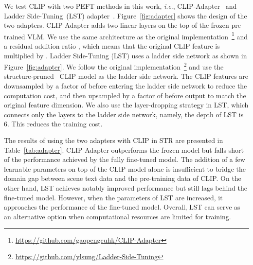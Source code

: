 \documentclass[lettersize,journal]{IEEEtran}
\newcommand{\ie}{\textit{i}.\textit{e}.}
\begin{document}
We test CLIP with two PEFT methods in this work, \ie,
CLIP-Adapter~\cite{2021_gao_clip_adapter} and Ladder Side-Tuning~(LST) adapter~\cite{2022_sung_lst}.
Figure~\ref{fig:adapter} shows the design of the two adapters.
CLIP-Adapter adds two linear layers on the top of the frozen pre-trained VLM.
We use the same architecture as the original implementation~\footnote{\url{https://github.com/gaopengcuhk/CLIP-Adapter}} and a residual addition ratio , which means that the original CLIP feature is multiplied by .
Ladder Side-Tuning (LST) uses a ladder side network as shown in Figure~\ref{fig:adapter}.
We follow the original implementation~\footnote{\url{https://github.com/ylsung/Ladder-Side-Tuning}} and use the structure-pruned~\cite{2017_li_pruningfilters} CLIP model as the ladder side network.
The CLIP features are downsampled by a factor of  before entering the ladder side network to reduce the computation cost, and then upsampled by a factor of  before output to match the original feature dimension.
We also use the layer-dropping strategy in LST, which connects only the layers  to the ladder side network, namely, the depth of LST is 6. This reduces the training cost.





The results of using the two adapters with CLIP in STR are presented in Table~\ref{tab:adapter}.
CLIP-Adapter outperforms the frozen model but falls short of the performance achieved by the fully fine-tuned model.
The addition of a few learnable parameters on top of the CLIP model alone is insufficient to bridge the domain gap between scene text data and the pre-training data of CLIP.
On the other hand, LST achieves notably improved performance but still lags behind the fine-tuned model.
However, when the parameters of LST are increased, it approaches the performance of the fine-tuned model.
Overall, LST can serve as an alternative option when computational resources are limited for training.
\end{document}
